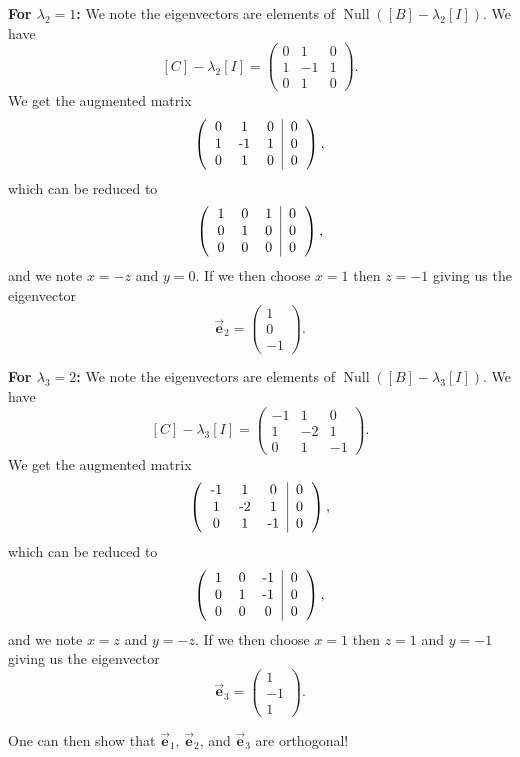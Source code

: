 \documentclass[12pt]{article} %
\newcommand{\Null}{\operatorname{Null}}
\newcommand{\evec}{\vec{\boldsymbol{e}}}
\begin{document}
\begin{solution}
\begin{enumerate}[(a)]
    \noindent\textbf{For $\lambda_2 = 1$:} We note the eigenvectors are elements of $\Null([B]-\lambda_2[I])$.  We have
    \[
    [C]-\lambda_2 [I] = \begin{pmatrix} 0 & 1 & 0 \\ 1 & -1 & 1 \\ 0 & 1 & 0 \end{pmatrix}.
    \]
    We get the augmented matrix
    \[
        \left(\begin{tabular}{ccc|c} 0 & 1 & 0 & 0 \\ 1 & -1 & 1 & 0 \\ 0 & 1 & 0 & 0 \end{tabular}\right),
    \]
    which can be reduced to
    \[
        \left(\begin{tabular}{ccc|c} 1 & 0 & 1 & 0 \\ 0 & 1 & 0 & 0 \\ 0 & 0 & 0 & 0 \end{tabular}\right),
    \]
    and we note $x=-z$ and $y=0$. If we then choose $x=1$ then $z=-1$ giving us the eigenvector
    \[
    \evec_2 = \begin{pmatrix} 1 \\ 0 \\ -1 \end{pmatrix}.
    \]

    \noindent\textbf{For $\lambda_3 = 2$:} We note the eigenvectors are elements of $\Null([B]-\lambda_3[I])$.  We have
    \[
    [C]-\lambda_3 [I] = \begin{pmatrix} -1 & 1 & 0 \\ 1 & -2 & 1 \\ 0 & 1 & -1 \end{pmatrix}.
    \]
    We get the augmented matrix
    \[
        \left(\begin{tabular}{ccc|c} -1 & 1 & 0 & 0 \\ 1 & -2 & 1 & 0 \\ 0 & 1 & -1 & 0 \end{tabular}\right),
    \]
    which can be reduced to
    \[
        \left(\begin{tabular}{ccc|c} 1 & 0 & -1 & 0 \\ 0 & 1 & -1 & 0 \\ 0 & 0 & 0 & 0 \end{tabular}\right),
    \]
    and we note $x=z$ and $y=-z$. If we then choose $x=1$ then $z=1$ and $y=-1$ giving us the eigenvector
    \[
    \evec_3 = \begin{pmatrix} 1 \\ -1 \\ 1 \end{pmatrix}.
    \]

    One can then show that $\evec_1$, $\evec_2$, and $\evec_3$ are orthogonal!
\end{enumerate}
\end{solution}
\end{document}
